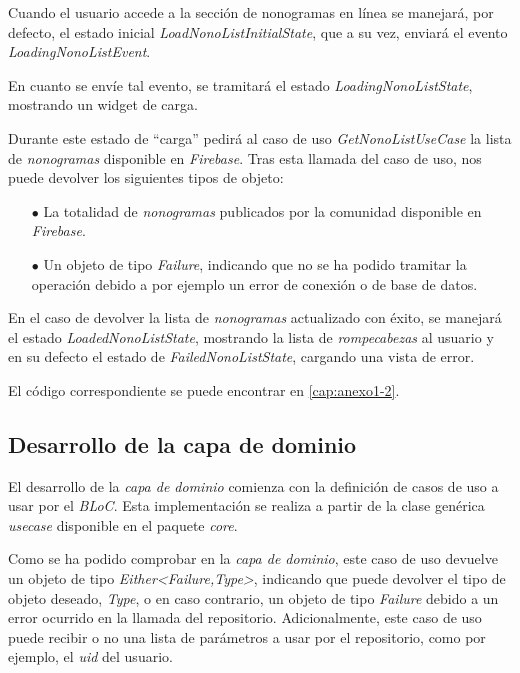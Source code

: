 Cuando el usuario accede a la sección de nonogramas en línea se manejará, por defecto, el estado
inicial \textit{LoadNonoListInitialState}, que a su vez, enviará el evento \textit{LoadingNonoListEvent}.

En cuanto se envíe tal evento, se tramitará el estado \textit{LoadingNonoListState}, mostrando
un widget de carga.

Durante este estado de ``carga'' pedirá al caso de uso \textit{GetNonoListUseCase} la lista de \textit{nonogramas}
disponible en \textit{Firebase}. Tras esta llamada del caso de uso, nos puede devolver los siguientes
tipos de objeto:

\begin{itemize}
  \item[$\bullet$] La totalidad de \textit{nonogramas} publicados por la comunidad disponible en \textit{Firebase}.
  \item[$\bullet$] Un objeto de tipo \textit{Failure}, indicando que no se ha podido tramitar la operación 
  debido a por ejemplo un error de conexión o de base de datos.
\end{itemize}

En el caso de devolver la lista de \textit{nonogramas} actualizado con éxito, se manejará el estado
\textit{LoadedNonoListState}, mostrando la lista de \textit{rompecabezas} al usuario y en su defecto el estado 
de \textit{FailedNonoListState}, cargando una vista de error. 

El código correspondiente se puede encontrar en
\autoref{cap:anexo1-2}.

\break

\subsection{Desarrollo de la capa de dominio}
El desarrollo de la \textit{capa de dominio} comienza con la definición de casos de uso a usar por el \textit{BLoC}.
Esta implementación se realiza a partir de la clase genérica \textit{usecase} disponible en el paquete \textit{core}.

Como se ha podido comprobar en la \textit{capa de dominio}, este caso de uso devuelve un objeto
de tipo \textit{Either<Failure,Type>}, indicando que puede devolver el tipo de objeto deseado, \textit{Type}, o en caso contrario,
un objeto de tipo \textit{Failure} debido a un error ocurrido en la llamada del repositorio. Adicionalmente, este caso de uso puede
recibir o no una lista de parámetros a usar por el repositorio, como por ejemplo, el \textit{uid} del usuario.

